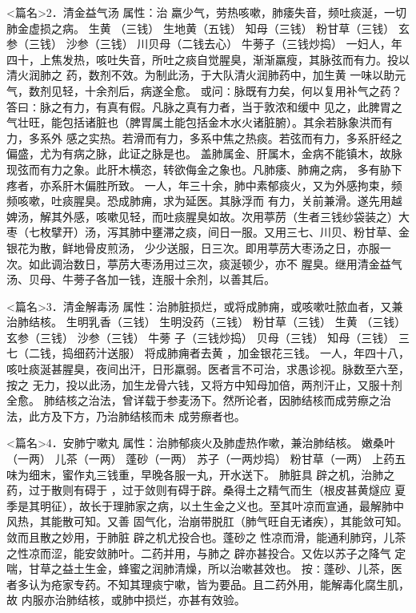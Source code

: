 \documentclass[a4paper,12pt,UTF8,twoside]{ctexbook}
\begin{document}
<篇名>2．清金益气汤
属性：治 羸少气，劳热咳嗽，肺痿失音，频吐痰涎，一切肺金虚损之病。 
生黄 （三钱） 生地黄（五钱） 知母（三钱） 粉甘草（三钱） 玄参（三钱） 沙参（三钱） 
川贝母（二钱去心） 牛蒡子（三钱炒捣） 
一妇人，年四十，上焦发热，咳吐失音，所吐之痰自觉腥臭，渐渐羸瘦，其脉弦而有力。投以清火润肺之 
药，数剂不效。为制此汤，于大队清火润肺药中，加生黄 一味以助元气，数剂见轻，十余剂后，病遂全愈。 
或问∶脉既有力矣，何以复用补气之药？答曰∶脉之有力，有真有假。凡脉之真有力者，当于敦浓和缓中 
见之，此脾胃之气壮旺，能包括诸脏也（脾胃属土能包括金木水火诸脏腑）。其余若脉象洪而有力，多系外 
感之实热。若滑而有力，多系中焦之热痰。若弦而有力，多系肝经之偏盛，尤为有病之脉，此证之脉是也。 
盖肺属金、肝属木，金病不能镇木，故脉现弦而有力之象。此肝木横恣，转欲侮金之象也。凡肺痿、肺痈之病， 
多有胁下疼者，亦系肝木偏胜所致。 
一人，年三十余，肺中素郁痰火，又为外感拘束，频频咳嗽，吐痰腥臭。恐成肺痈，求为延医。其脉浮而 
有力，关前兼滑。遂先用越婢汤，解其外感，咳嗽见轻，而吐痰腥臭如故。次用葶苈（生者三钱纱袋装之）大 
枣（七枚擘开）汤，泻其肺中壅滞之痰，间日一服。又用三七、川贝、粉甘草、金银花为散，鲜地骨皮煎汤， 
少少送服，日三次。即用葶苈大枣汤之日，亦服一次。如此调治数日，葶苈大枣汤用过三次，痰涎顿少，亦不 
腥臭。继用清金益气汤、贝母、牛蒡子各加一钱，连服十余剂，以善其后。 


<篇名>3．清金解毒汤
属性：治肺脏损烂，或将成肺痈，或咳嗽吐脓血者，又兼治肺结核。 
生明乳香（三钱） 生明没药（三钱） 粉甘草（三钱） 生黄 （三钱） 玄参（三钱） 沙参（三钱） 牛蒡 
子（三钱炒捣） 贝母（三钱） 知母（三钱） 三七（二钱，捣细药汁送服） 
将成肺痈者去黄 ，加金银花三钱。 
一人，年四十八，咳吐痰涎甚腥臭，夜间出汗，日形羸弱。医者言不可治，求愚诊视。脉数至六至，按之 
无力，投以此汤，加生龙骨六钱，又将方中知母加倍，两剂汗止，又服十剂全愈。 
肺结核之治法，曾详载于参麦汤下。然所论者，因肺结核而成劳瘵之治法，此方及下方，乃治肺结核而未 
成劳瘵者也。 


<篇名>4．安肺宁嗽丸
属性：治肺郁痰火及肺虚热作嗽，兼治肺结核。 
嫩桑叶（一两） 儿茶（一两） 蓬砂（一两） 苏子（一两炒捣） 粉甘草（一两） 
上药五味为细末，蜜作丸三钱重，早晚各服一丸，开水送下。 
肺脏具 辟之机，治肺之药，过于散则有碍于 ，过于敛则有碍于辟。桑得土之精气而生（根皮甚黄燧应 
夏季是其明征），故长于理肺家之病，以土生金之义也。至其叶凉而宣通，最解肺中风热，其能散可知。又善 
固气化，治崩带脱肛（肺气旺自无诸疾），其能敛可知。敛而且散之妙用，于肺脏 辟之机尤投合也。蓬砂之 
性凉而滑，能通利肺窍，儿茶之性凉而涩，能安敛肺叶。二药并用，与肺之 辟亦甚投合。又佐以苏子之降气 
定喘，甘草之益土生金，蜂蜜之润肺清燥，所以治嗽甚效也。 
按∶蓬砂、儿茶，医者多认为疮家专药。不知其理痰宁嗽，皆为要品。且二药外用，能解毒化腐生肌，故 
内服亦治肺结核，或肺中损烂，亦甚有效验。 
\end{document}

